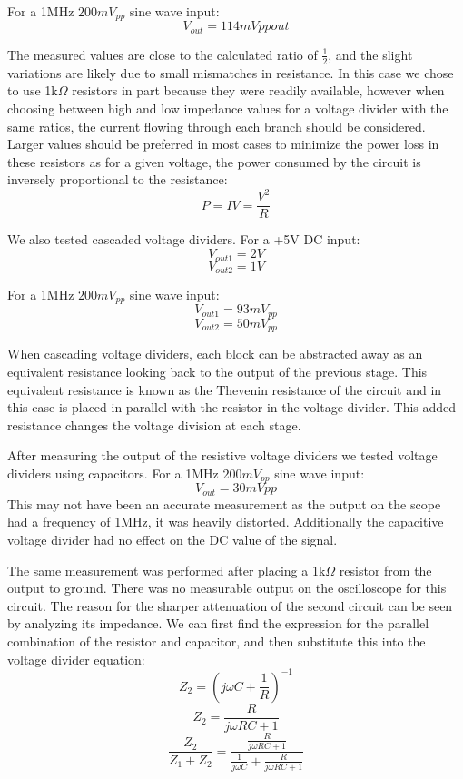 \documentclass[11pt]{article}
\begin{document}
  For a 1MHz $200mV_{pp}$ sine wave input:
  $$V_{out} = 114mVpp out$$
  
  The measured values are close to the calculated ratio of $\frac{1}{2}$, and the slight variations are likely due to small mismatches in resistance.  In this case we chose to use 1k$\Omega$ resistors in part because they were readily available, however when choosing between high and low impedance values for a voltage divider with the same ratios, the current flowing through each branch should be considered. Larger values should be preferred in most cases to minimize the power loss in these resistors as for a given voltage, the power consumed by the circuit is inversely proportional to the resistance:
  $$P = IV = \frac{V^2}{R}$$ 
  
  We also tested cascaded voltage dividers.
  For a +5V DC input:
  $$V_{out1} =  2 V$$
  $$V_{out2} =  1 V$$
  
  For a 1MHz $200mV_{pp}$ sine wave input:
  $$V_{out1} = 93 mV_{pp}$$
  $$V_{out2} = 50 mV_{pp}$$
  
  When cascading voltage dividers, each block can be abstracted away as an equivalent resistance looking back to the output of the previous stage.  This equivalent resistance is known as the Thevenin resistance of the circuit and in this case is placed in parallel with the resistor in the voltage divider.  This added resistance changes the voltage division at each stage.
  
  After measuring the output of the resistive voltage dividers we tested voltage dividers using capacitors.
  For a 1MHz $200mV_{pp}$ sine wave input:
  $$V_{out} = 30 mVpp$$
  This may not have been an accurate measurement as the output on the scope had a frequency of 1MHz, it was heavily distorted. Additionally the capacitive voltage divider had no effect on the DC value of the signal.
  
  The same measurement was performed after placing a 1k$\Omega$ resistor from the output to ground.  There was no measurable output on the oscilloscope for this circuit.  The reason for the sharper attenuation of the second circuit can be seen by analyzing its impedance.  We can first find the expression for the parallel combination of the resistor and capacitor, and then substitute this into the voltage divider equation:
  $$Z_2 = \left(j\omega C + \frac{1}{R}\right)^{-1}$$
  $$Z_2 = \frac{R}{j\omega RC + 1}$$
  $$\frac{Z_2}{Z_1 + Z_2} = \frac{\frac{R}{j\omega RC + 1}}{\frac{1}{j\omega C} + \frac{R}{j\omega RC + 1}}$$
  
\end{document}
